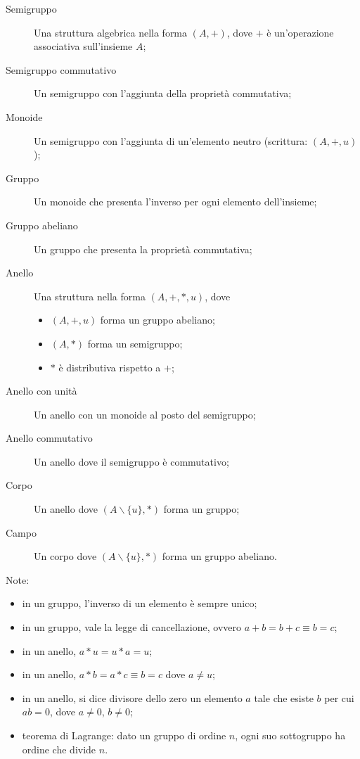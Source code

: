 \documentclass[10pt]{article}
\begin{document}
        \begin{description}
            
            \item[Semigruppo] Una struttura algebrica nella forma \((A, +)\), dove \(+\) è un'operazione associativa sull'insieme \(A\);
            \item[Semigruppo commutativo] Un semigruppo con l'aggiunta della proprietà commutativa;
            \item[Monoide] Un semigruppo con l'aggiunta di un'elemento neutro (scrittura: \((A, +, u)\));
            \item[Gruppo] Un monoide che presenta l'inverso per ogni elemento dell'insieme;
            \item[Gruppo abeliano] Un gruppo che presenta la proprietà commutativa;
            \item[Anello] Una struttura nella forma \((A, +, *, u)\), dove
                \begin{itemize}
                    \item \((A, +, u)\) forma un gruppo abeliano;
                    \item \((A, *)\) forma un semigruppo;
                    \item \(*\) è distributiva rispetto a \(+\);
                \end{itemize}
            \item[Anello con unità] Un anello con un monoide al posto del semigruppo;
            \item[Anello commutativo] Un anello dove il semigruppo è commutativo;
            \item[Corpo] Un anello dove \((A \backslash \{u\}, *)\) forma un gruppo;
            \item[Campo] Un corpo dove \((A \backslash \{u\}, *)\) forma un gruppo abeliano.

        \end{description}

        Note:
        \begin{itemize}
            \item in un gruppo, l'inverso di un elemento è sempre unico;
            \item in un gruppo, vale la legge di cancellazione, ovvero \(a + b = b + c \equiv b = c\);
            \item in un anello, \(a * u = u * a = u\);
            \item in un anello, \(a * b = a * c \equiv b = c\) dove \(a \neq u\);
            \item in un anello, si dice divisore dello zero un elemento \(a\) tale che esiste \(b\) per
                cui \(ab = 0\), dove \(a \neq 0\), \(b \neq 0\);
            \item teorema di Lagrange: dato un gruppo di ordine \(n\), ogni suo sottogruppo ha ordine che divide \(n\).
        \end{itemize}
\end{document}

